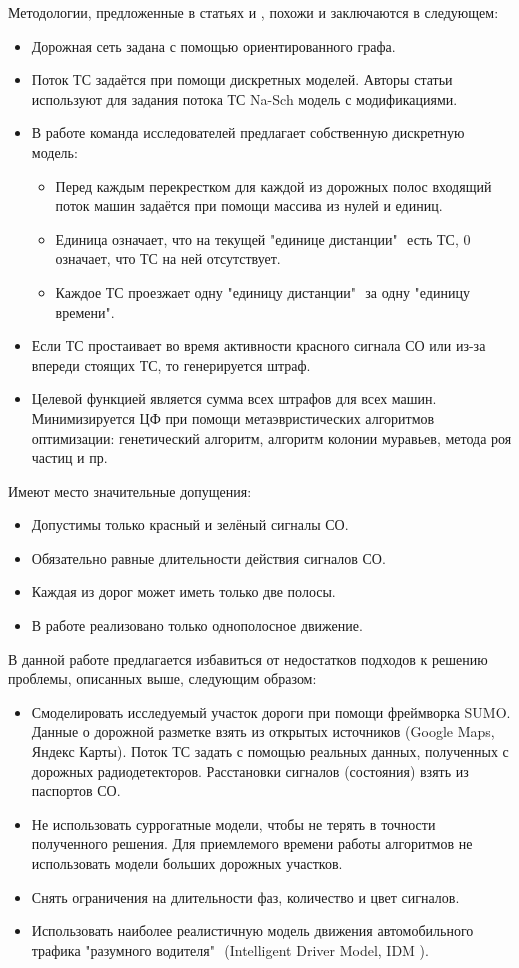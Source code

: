 Методологии, предложенные в статьях \cite{Chen2007AlgorithmsFT} и \cite{PSO-weak}, похожи и заключаются в следующем: 
\begin{itemize}
	\item Дорожная сеть задана с помощью ориентированного графа.
	\item Поток ТС задаётся при помощи дискретных моделей. Авторы статьи \cite{PSO-weak} используют для задания потока ТС Na-Sch модель \cite{Na-Sch-ref} с модификациями.
	\item В работе \cite{Chen2007AlgorithmsFT} команда исследователей предлагает собственную дискретную модель:
	\begin{itemize}
		\item Перед каждым перекрестком для каждой из дорожных полос входящий поток машин задаётся при помощи массива из нулей и единиц.
		\item Единица означает, что на текущей "единице дистанции" $ $ есть ТС, 0 означает, что ТС на ней отсутствует.
		\item Каждое ТС проезжает одну "единицу дистанции" $ $ за одну "единицу времени".
	\end{itemize}
	\item Если ТС простаивает во время активности красного сигнала СО или из-за впереди стоящих ТС, то генерируется штраф.
	\item Целевой функцией является сумма всех штрафов для всех машин. Минимизируется ЦФ при помощи метаэвристических алгоритмов оптимизации: генетический алгоритм, алгоритм колонии муравьев, метода роя частиц и пр.
\end{itemize}
\newpage
Имеют место значительные допущения:
\begin{itemize}
	\item Допустимы только красный и зелёный сигналы СО.
	\item Обязательно равные длительности действия сигналов СО.
	\item Каждая из дорог может иметь только две полосы.
	\item В работе \cite{PSO-weak} реализовано только однополосное движение.
\end{itemize}

В данной работе предлагается избавиться от недостатков подходов к решению проблемы, описанных выше, следующим образом:
\begin{itemize}
		\item Смоделировать исследуемый участок дороги при помощи фреймворка SUMO. Данные о дорожной разметке взять из открытых источников (Google Maps, Яндекс Карты). Поток ТС задать с помощью реальных данных, полученных с дорожных радиодетекторов. Расстановки сигналов (состояния) взять из паспортов СО.
		\item Не использовать суррогатные модели, чтобы не терять в точности полученного решения. Для приемлемого времени работы алгоритмов не использовать модели больших дорожных участков.
		\item Снять ограничения на длительности фаз, количество и цвет сигналов.
		\item Использовать наиболее реалистичную модель движения автомобильного трафика "разумного водителя" $ $ (Intelligent Driver Model, IDM \cite{book-Gasnikov}).
\end{itemize}
\newpage
